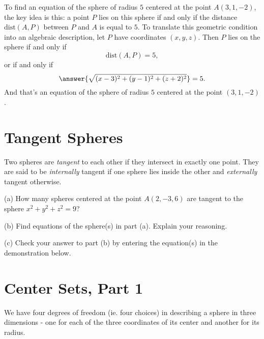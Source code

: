 \documentclass{ximera}
\begin{document}
\begin{question}   \label{QDfsdgfte}
To find an equation of the sphere of radius $5$ centered at the point $A(3,1,-2)$, the key idea is this: a point $P$ lies on this sphere  if and only if the distance $\text{dist}(A,P)$ between $P$ and $A$ is equal to $5$. To translate this geometric condition into an algebraic description, let $P$ have coordinates $(x,y,z)$. Then $P$ lies on the sphere if and only if
\[
   \text{dist}(A,P) = 5 ,
\]
or if and only if 
\[
      \answer{\sqrt{(x-3)^2+ (y-1)^2 + (z+2)^2}} = 5   .
\]
And that's an equation of the sphere of radius $5$ centered at the point $(3,1,-2)$.
\end{question}





\section*{Tangent Spheres}
Two spheres are \emph{tangent} to each other if they intersect in exactly one point. They are said to be \emph{internally} tangent if one sphere lies inside the other and \emph{externally} tangent otherwise.

\begin{question}   \label{Q9sdf43gt4t44}
(a) How many spheres centered at the point $A(2,-3,6)$ are tangent to the sphere $x^2 + y^2 +z^2 = 9$?

(b) Find equations of the sphere(s) in part (a). Explain your reasoning. 

(c) Check your answer to part (b) by entering the equation(s) in the demonstration below.

\begin{exploration}
\begin{onlineOnly}
    \begin{center}
\end{center}
\end{onlineOnly}
\end{exploration}

\end{question}



\section*{Center Sets, Part 1}
We have four degrees of freedom (ie. four choices) in describing a sphere in three dimensions - one for each of the three coordinates of its center and another for its radius.
\end{document}

